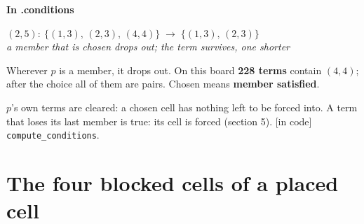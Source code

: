 \documentclass[10pt,a4paper]{article}
\newcommand{\incode}{\textsf{\scriptsize\color{okc}[in code]}}
\newcommand{\interms}{\par\medskip\textsf{\small\bfseries\color{inksoft}In .conditions}\par}
\newcommand{\code}[1]{\texttt{#1}}
\newcommand{\T}[1]{\ensuremath{\{#1\}}}
\newenvironment{algebra}{\begin{center}\begin{minipage}{0.92\linewidth}\small\setlength{\parskip}{0.2em}}{\end{minipage}\end{center}}
\newcommand{\cmt}[1]{{\color{inksoft}\textit{#1}}}
\begin{document}
\interms
\begin{algebra}
$(2,5):\ \T{(1,3),\,(2,3),\,(4,4)} \;\longrightarrow\; \T{(1,3),\,(2,3)}$\\
\cmt{a member that is chosen drops out; the term survives, one shorter}
\end{algebra}
Wherever $p$ is a member, it drops out. On this board \textbf{228 terms} contain $(4,4)$; after the choice all of them are pairs. Chosen means \textbf{member satisfied}.

$p$'s own terms are cleared: a chosen cell has nothing left to be forced into. A term that loses its last member is true: its cell is forced (section 5). \incode{} \code{compute\_conditions}.

\section{The four blocked cells of a placed cell}
\end{document}
